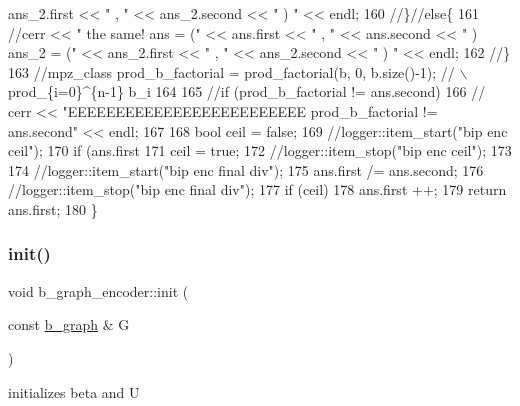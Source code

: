 \begin{DoxyCode}
{       ans\_2.first << " , " << ans\_2.second << " ) "  << endl;}
160   \textcolor{comment}{//\}//else\{}
161   \textcolor{comment}{//cerr << " the same! ans = (" << ans.first << " , " << ans.second <<  " ) ans\_2 = (" << ans\_2.first << "
       , " << ans\_2.second << " ) "  << endl;}
162   \textcolor{comment}{//\}}
163   \textcolor{comment}{//mpz\_class prod\_b\_factorial = prod\_factorial(b, 0, b.size()-1); // \(\backslash\)prod\_\{i=0\}^\{n-1\} b\_i}
164 
165   \textcolor{comment}{//if (prod\_b\_factorial != ans.second)}
166   \textcolor{comment}{//  cerr << "EEEEEEEEEEEEEEEEEEEEEEEEE prod\_b\_factorial != ans.second" << endl;}
167 
168   \textcolor{keywordtype}{bool} ceil = \textcolor{keyword}{false};
169   \textcolor{comment}{//logger::item\_start("bip enc ceil");}
170   \textcolor{keywordflow}{if} (ans.first %
171     ceil = \textcolor{keyword}{true};
172   \textcolor{comment}{//logger::item\_stop("bip enc ceil");}
173 
174   \textcolor{comment}{//logger::item\_start("bip enc final div");}
175   ans.first /= ans.second;
176   \textcolor{comment}{//logger::item\_stop("bip enc final div");}
177   \textcolor{keywordflow}{if} (ceil)
178     ans.first ++;
179   \textcolor{keywordflow}{return} ans.first;
180 \}
\end{DoxyCode}
\mbox{\label{classb__graph__encoder_a9b62ac0580191ac42b98d764046af7cb}} 
\subsubsection{\texorpdfstring{init()}{init()}}
{\footnotesize\ttfamily void b\+\_\+graph\+\_\+encoder\+::init (\begin{DoxyParamCaption}\item[{const \hyperlink{classb__graph}{b\+\_\+graph} \&}]{G }\end{DoxyParamCaption})}



initializes beta and U 


